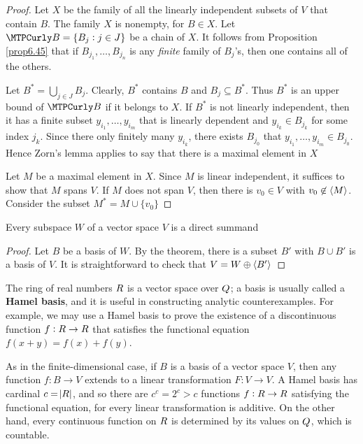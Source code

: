 \documentclass[11pt]{article}
\begin{document}
\begin{proof}
Let \(X\) be the family of all the linearly independent subsets of \(V\) that
contain \(B\). The family \(X\) is nonempty, for \(B\in X\). Let
\(\calb=\{B_j:j\in J\}\) be a chain of \(X\). It follows from Proposition 
\ref{prop6.45} that if \(B_{j_1},\dots,B_{j_n}\) is any \emph{finite} family of
\(B_j\)'s, then one contains all of the others.

Let \(B^*=\bigcup_{j\in J}B_j\). Clearly, \(B^*\) contains \(B\) and 
\(B_j\subseteq B^*\). Thus \(B^*\) is an upper bound of \(\calb\) if it
belongs to \(X\). If \(B^*\) is not linearly independent, then it has a finite
subset \(y_{i_1},\dots,y_{i_m}\) that is linearly dependent and 
\(y_{i_k}\in B_{j_k}\) for some index \(j_k\). Since there only finitely many 
\(y_{i_k}\), there exists \(B_{j_0}\) that 
\(y_{i_1},\dots,y_{i_m}\in B_{j_0}\). Hence Zorn's lemma applies to say that
there is a maximal element in \(X\)

Let \(M\) be a maximal element in \(X\). Since \(M\) is linear independent, it
suffices to show that \(M\) spans \(V\). If \(M\) does not span \(V\), then there
is \(v_0\in V\) with \(v_0\not\in\langle M\rangle\). Consider the subset 
\(M^*=M\cup\{v_0\}\)
\end{proof}

\begin{corollary}[]
Every subspace \(W\) of a vector space \(V\) is a direct summand
\end{corollary}
\begin{proof}
Let \(B\) be a basis of \(W\). By the theorem, there is a subset \(B'\) with 
\(B\cup B'\) is a basis of \(V\). It is straightforward to check that 
\(V=W\oplus\langle B'\rangle\)
\end{proof}

The ring of real numbers \(\relax{R}\) is a vector space over \(\relax{Q}\); a basis is
usually called a \textbf{Hamel basis}, and it is useful in constructing analytic
counterexamples. For example, we may use a Hamel basis to prove the existence
of a discontinuous function \(f:\relax{R}\to\relax{R}\) that satisfies the functional
equation \(f(x+y)=f(x)+f(y)\).

As in the finite-dimensional case, if \(B\) is a basis of a vector space \(V\),
then any function \(f:B\to V\) extends to a linear transformation \(F:V\to
   V\). A Hamel basis has cardinal \(c=\abs{\relax{R}}\), and so there are
\(c^c=2^c>c\) functions \(f:\relax{R}\to\relax{R}\) satisfying the functional equation, for
every linear transformation is additive. On the other hand, every continuous
function on \(\relax{R}\) is determined by its values on \(\relax{Q}\), which is countable.
\end{document}
